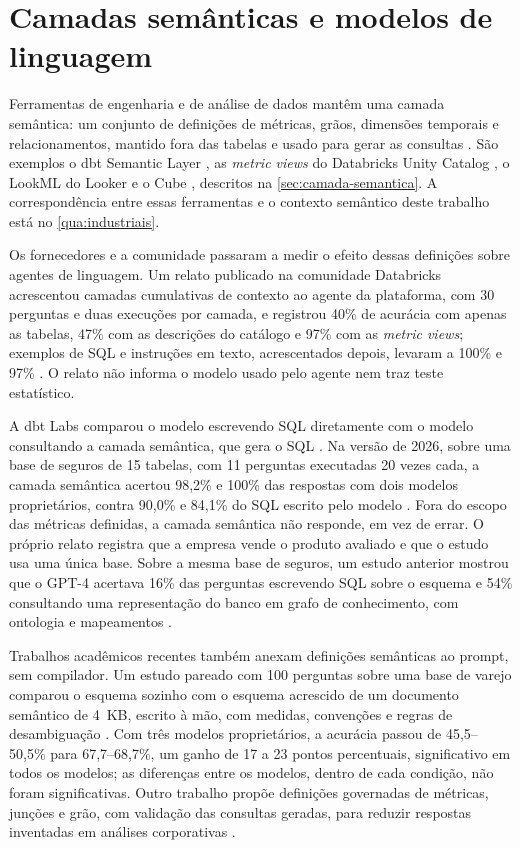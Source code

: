 \section{Camadas semânticas e modelos de linguagem}
\label{sec:industria}

Ferramentas de engenharia e de análise de dados mantêm uma camada
semântica: um conjunto de definições de métricas, grãos, dimensões
temporais e relacionamentos, mantido fora das tabelas e usado para gerar
as consultas \cite{jones2024semanticlayer}. São exemplos o dbt Semantic
Layer \cite{dbt_semanticlayer}, as \textit{metric views} do Databricks
Unity Catalog \cite{databricks_metricviews}, o LookML do Looker
\cite{looker_lookml} e o Cube \cite{cube_datamodel}, descritos na
\autoref{sec:camada-semantica}. A correspondência entre essas ferramentas
e o contexto semântico deste trabalho está no \autoref{qua:industriais}.

Os fornecedores e a comunidade passaram a medir o efeito dessas
definições sobre agentes de linguagem. Um relato publicado na comunidade
Databricks acrescentou camadas cumulativas de contexto ao agente da
plataforma, com 30 perguntas e duas execuções por camada, e registrou 40\%
de acurácia com apenas as tabelas, 47\% com as descrições do catálogo e
97\% com as \textit{metric views}; exemplos de SQL e instruções em texto,
acrescentados depois, levaram a 100\% e 97\% \cite{databricks2026genie}.
O relato não informa o modelo usado pelo agente nem traz teste
estatístico.

A dbt Labs comparou o modelo escrevendo SQL diretamente com o modelo
consultando a camada semântica, que gera o SQL
\cite{ganz2023semanticlayer,ganz2026benchmark}. Na versão de 2026, sobre
uma base de seguros de 15 tabelas, com 11 perguntas executadas 20 vezes
cada, a camada semântica acertou 98,2\% e 100\% das respostas com dois
modelos proprietários, contra 90,0\% e 84,1\% do SQL escrito pelo modelo
\cite{ganz2026benchmark}. Fora do escopo das métricas definidas, a camada
semântica não responde, em vez de errar. O próprio relato registra que a
empresa vende o produto avaliado e que o estudo usa uma única base. Sobre
a mesma base de seguros, um estudo anterior mostrou que o GPT-4 acertava
16\% das perguntas escrevendo SQL sobre o esquema e 54\% consultando uma
representação do banco em grafo de conhecimento, com ontologia e
mapeamentos \cite{sequeda2023benchmark}.

Trabalhos acadêmicos recentes também anexam definições semânticas ao
prompt, sem compilador. Um estudo pareado com 100 perguntas sobre uma
base de varejo comparou o esquema sozinho com o esquema acrescido de um
documento semântico de 4~KB, escrito à mão, com medidas, convenções e
regras de desambiguação \cite{rumiantsau2026semantic}. Com três modelos
proprietários, a acurácia passou de 45,5--50,5\% para 67,7--68,7\%, um
ganho de 17 a 23 pontos percentuais, significativo em todos os modelos; as
diferenças entre os modelos, dentro de cada condição, não foram
significativas. Outro trabalho propõe definições governadas de métricas,
junções e grão, com validação das consultas geradas, para reduzir
respostas inventadas em análises corporativas \cite{pillai2026ground}.

